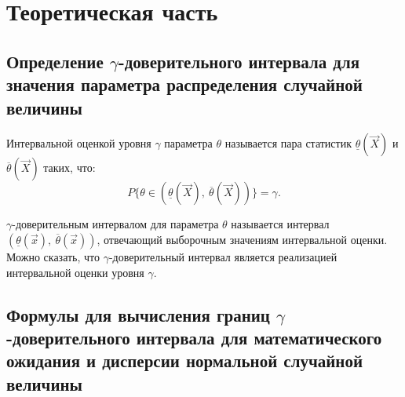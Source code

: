 \section{Теоретическая часть}
\subsection{Определение \( \gamma \)-доверительного интервала для значения
параметра распределения случайной величины}

Интервальной оценкой уровня \( \gamma \)  параметра \( \theta \) 
называется пара статистик $\underline \theta (\vec X)$ и $\overline \theta
(\vec X)$ таких, что:
\begin{equation*}
    P\{ \theta \in (\underline{\theta}(\vec{X}),\ \overline{\theta}(\vec{X})) \} = \gamma.
\end{equation*}

\( \gamma \)-доверительным интервалом для параметра \( \theta \) называется интервал 
\( (\underline{\theta}(\vec{x}),\ \overline{\theta}(\vec{x})) \), отвечающий выборочным
значениям интервальной оценки. Можно сказать, что \( \gamma \)-доверительный интервал
является реализацией интервальной оценки уровня \( \gamma \).

\subsection{Формулы для вычисления границ \( \gamma \)-доверительного интервала 
для математического ожидания и дисперсии нормальной случайной величины}

